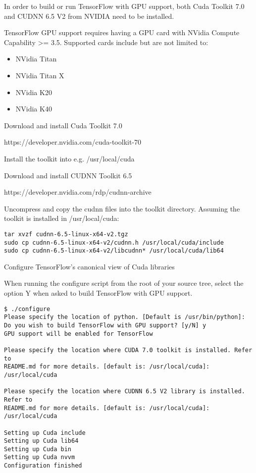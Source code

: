 In order to build or run TensorFlow with GPU support, both Cuda Toolkit 7.0 and CUDNN 6.5 V2 from NVIDIA need to be installed.

TensorFlow GPU support requires having a GPU card with NVidia Compute Capability >= 3.5. Supported cards include but are not limited to:

\begin{itemize}
\item NVidia Titan
\item NVidia Titan X
\item NVidia K20
\item NVidia K40
\end{itemize}

Download and install Cuda Toolkit 7.0

https://developer.nvidia.com/cuda-toolkit-70

Install the toolkit into e.g. /usr/local/cuda

Download and install CUDNN Toolkit 6.5

https://developer.nvidia.com/rdp/cudnn-archive

Uncompress and copy the cudnn files into the toolkit directory. Assuming the toolkit is installed in /usr/local/cuda:

\begin{lstlisting}
tar xvzf cudnn-6.5-linux-x64-v2.tgz
sudo cp cudnn-6.5-linux-x64-v2/cudnn.h /usr/local/cuda/include
sudo cp cudnn-6.5-linux-x64-v2/libcudnn* /usr/local/cuda/lib64
\end{lstlisting}

Configure TensorFlow's canonical view of Cuda libraries

When running the configure script from the root of your source tree, select the option Y when asked to build TensorFlow with GPU support.

\begin{lstlisting}
$ ./configure
Please specify the location of python. [Default is /usr/bin/python]:
Do you wish to build TensorFlow with GPU support? [y/N] y
GPU support will be enabled for TensorFlow

Please specify the location where CUDA 7.0 toolkit is installed. Refer to
README.md for more details. [default is: /usr/local/cuda]: /usr/local/cuda

Please specify the location where CUDNN 6.5 V2 library is installed. Refer to
README.md for more details. [default is: /usr/local/cuda]: /usr/local/cuda

Setting up Cuda include
Setting up Cuda lib64
Setting up Cuda bin
Setting up Cuda nvvm
Configuration finished
\end{lstlisting}

